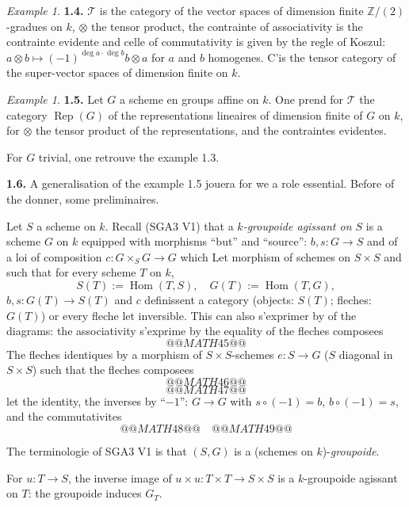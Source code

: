 \documentclass[12pt,a4paper]{article}
\theoremstyle{plain}
\theoremstyle{definition}
\theoremstyle{remark}
\newtheorem{example}[theorem]{Example}
\DeclareMathOperator{\Hom}{Hom}
\DeclareMathOperator{\Rep}{Rep}
\begin{document}
\begin{example}
\textbf{1.4.} $\mathcal{T}$ is the category of the vector spaces of dimension finite $\mathbb{Z}/(2)$-gradues on $k$, $\otimes$ the tensor product, the contrainte of associativity is the contrainte evidente and celle of commutativity is given by the regle of Koszul: $a \otimes b \mapsto (-1)^{\deg a \cdot \deg b} b \otimes a$ for $a$ and $b$ homogenes. C'is the tensor category of the super-vector spaces of dimension finite on $k$.
\end{example}

\begin{example}
\textbf{1.5.} Let $G$ a scheme en groups affine on $k$. One prend for $\mathcal{T}$ the category $\Rep(G)$ of the representations lineaires of dimension finite of $G$ on $k$, for $\otimes$ the tensor product of the representations, and the contraintes evidentes.

For $G$ trivial, one retrouve the example 1.3.
\end{example}

\textbf{1.6.} A generalisation of the example 1.5 jouera for we a role essential. Before of the donner, some preliminaires.

Let $S$ a scheme on $k$. Recall (SGA3 V1) that a \emph{$k$-groupoide agissant on $S$} is a scheme $G$ on $k$ equipped with morphisms ``but'' and ``source'': $b,s : G \to S$ and of a loi of composition $c : G \times_S G \to G$ which Let morphism of schemes on $S \times S$ and such that for every scheme $T$ on $k$,
\[
S(T) := \Hom(T,S), \quad G(T) := \Hom(T,G),
\]
$b,s : G(T) \to S(T)$ and $c$ definissent a category (objects: $S(T)$; fleches: $G(T)$) or every fleche let inversible. This can also s'exprimer by of the diagrams: the associativity s'exprime by the equality of the fleches composees
\[
@@MATH45@@
\]
The fleches identiques by a morphism of $S \times S$-schemes $e : S \to G$ ($S$ diagonal in $S \times S$) such that the fleches composees
\[
@@MATH46@@
\]
\[
@@MATH47@@
\]
let the identity, the inverses by ``$-1$'': $G \to G$ with $s \circ (-1) = b$, $b \circ (-1) = s$, and the commutativites
\[
@@MATH48@@
\quad
@@MATH49@@
\]

The terminologie of SGA3 V1 is that $(S,G)$ is a (schemes on $k$)-\emph{groupoide}.

For $u : T \to S$, the inverse image of $u \times u : T \times T \to S \times S$ is a $k$-groupoide agissant on $T$: the groupoide induces $G_T$.
\end{document}

